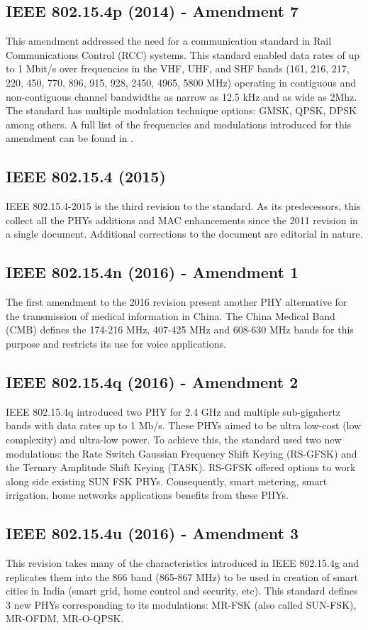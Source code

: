\documentclass[conference]{IEEEtran}
\begin{document}
\subsection{IEEE 802.15.4p (2014) - Amendment 7 }\label{wpan2014p}
This amendment \cite{std2014p} addressed the need for a communication standard in Rail Communications Control (RCC) systems. This standard enabled data rates of up to 1 Mbit/s over frequencies in the VHF, UHF, and SHF bands (161, 216, 217, 220, 450, 770, 896, 915, 928, 2450, 4965, 5800 MHz) operating in contiguous and non-contiguous channel bandwidths as narrow as 12.5 kHz and as wide as 2Mhz. The standard has multiple modulation technique options: GMSK, QPSK, DPSK among others. A full list of the frequencies and modulations introduced for this amendment can be found in \cite[pp. 386]{std2015}.
\subsection{IEEE 802.15.4 (2015) }\label{wpan2015}
IEEE 802.15.4-2015 \cite{std2015} is the third revision to the standard. As its predecessors, this collect all the PHYs additions and MAC enhancements since the 2011 revision in a single document. Additional corrections to the document are editorial in nature. 
\subsection{IEEE 802.15.4n (2016) - Amendment 1 }\label{wpan2016n}
The first amendment \cite{std2016n} to the 2016 revision present another PHY alternative for the transmission of medical information in China. The China Medical Band (CMB) defines the 174-216 MHz, 407-425 MHz and 608-630 MHz bands for this purpose and restricts its use for voice applications.
\subsection{IEEE 802.15.4q (2016) - Amendment 2 }\label{wpan2016q}
IEEE 802.15.4q \cite{std2016q} introduced two PHY for 2.4 GHz and multiple sub-gigahertz bands with data rates up to 1 Mb/s. These PHYs aimed to be ultra low-cost (low complexity) and ultra-low power. To achieve this, the standard used two new modulations: the Rate Switch Gaussian Frequency Shift Keying (RS-GFSK) and the Ternary Amplitude Shift Keying (TASK). RS-GFSK offered options to work along side existing SUN FSK PHYs. Consequently, smart metering, smart irrigation, home networks applications benefits from these PHYs.
\subsection{IEEE 802.15.4u (2016) - Amendment 3 }\label{wpan2016u}
This revision \cite{std2016u} takes many of the characteristics introduced in IEEE 802.15.4g and replicates them into the 866 band (865-867 MHz) to be used in creation of smart cities in India (smart grid, home control and security, etc). This standard defines 3 new PHYs corresponding to its modulations: MR-FSK (also called SUN-FSK), MR-OFDM, MR-O-QPSK.
\end{document}
